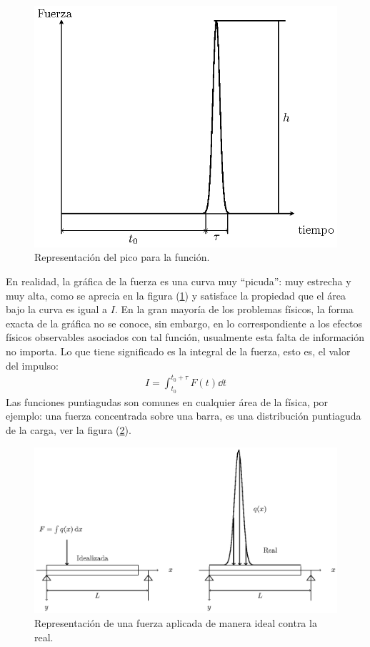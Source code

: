 \begin{figure}[H]
    \centering
    \includegraphics[scale=1]{Imagenes/delta_Dirac_01.eps}
    \caption{Representación del pico para la función.}
    \label{fig:figura_delta_Dirac_01}
\end{figure}
En realidad, la gráfica de la fuerza es una curva muy \enquote{picuda}: muy estrecha y muy alta, como se aprecia en la figura (\ref{fig:figura_delta_Dirac_01}) y satisface la propiedad que el área bajo la curva es igual a $I$. En la gran mayoría de los problemas físicos, la forma exacta de la gráfica no se conoce, sin embargo, en lo correspondiente a los efectos físicos observables asociados con tal función, usualmente esta falta de información no importa. Lo que tiene significado es la integral de la fuerza, esto es, el valor del impulso:
\begin{align*}
I = \int_{t_{0}}^{t_{0} + \tau } F(t) \dd{t}
\end{align*}
Las funciones puntiagudas son comunes en cualquier área de la física, por ejemplo: una fuerza concentrada sobre una barra, es una distribución puntiaguda de la carga, ver la figura (\ref{fig:figura_delta_Dirac_02}). 
\begin{figure}[H]
    \centering
    \includegraphics[scale=1]{Imagenes/delta_Dirac_02.eps}
    \caption{Representación de una fuerza aplicada de manera ideal contra la real.}
    \label{fig:figura_delta_Dirac_02}
\end{figure}

